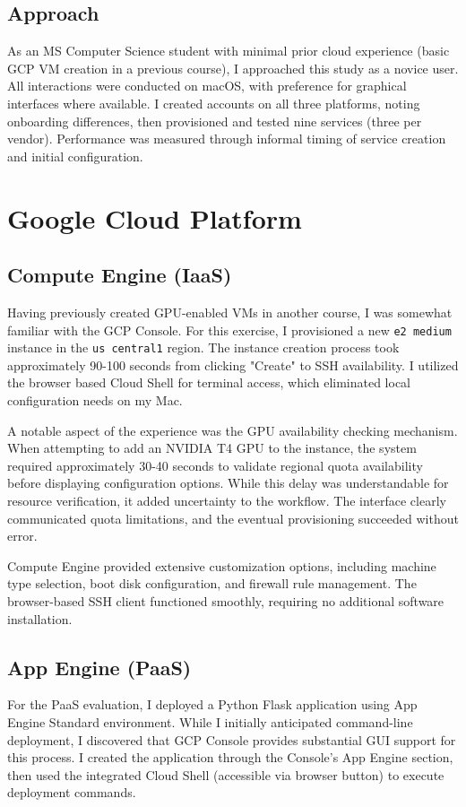 \documentclass[11pt,a4paper]{article}
\begin{document}
\subsection{Approach}
As an MS Computer Science student with minimal prior cloud experience (basic GCP VM creation in a previous course), I approached this study as a novice user. All interactions were conducted on macOS, with preference for graphical interfaces where available. I created accounts on all three platforms, noting onboarding differences, then provisioned and tested nine services (three per vendor). Performance was measured through informal timing of service creation and initial configuration.

\section{Google Cloud Platform}

\subsection{Compute Engine (IaaS)}
Having previously created GPU-enabled VMs in another course, I was somewhat familiar with the GCP Console. For this exercise, I provisioned a new \texttt{e2 medium} instance in the \texttt{us central1} region. The instance creation process took approximately 90-100 seconds from clicking "Create" to SSH availability. I utilized the browser based Cloud Shell for terminal access, which eliminated local configuration needs on my Mac.

A notable aspect of the experience was the GPU availability checking mechanism. When attempting to add an NVIDIA T4 GPU to the instance, the system required approximately 30-40 seconds to validate regional quota availability before displaying configuration options. While this delay was understandable for resource verification, it added uncertainty to the workflow. The interface clearly communicated quota limitations, and the eventual provisioning succeeded without error.

Compute Engine provided extensive customization options, including machine type selection, boot disk configuration, and firewall rule management. The browser-based SSH client functioned smoothly, requiring no additional software installation.

\subsection{App Engine (PaaS)}
For the PaaS evaluation, I deployed a Python Flask application using App Engine Standard environment. While I initially anticipated command-line deployment, I discovered that GCP Console provides substantial GUI support for this process. I created the application through the Console's App Engine section, then used the integrated Cloud Shell (accessible via browser button) to execute deployment commands.
\end{document}
